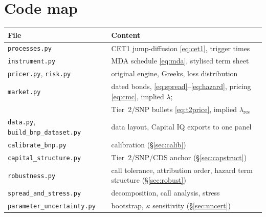\documentclass[11pt]{article}
\newcommand{\1}{\mathbf{1}}
\begin{document}
\section{Code map}
\begin{center}
\small
\begin{tabular}{ll}
\toprule
File & Content \\
\midrule
\texttt{processes.py} & CET1 jump-diffusion \eqref{eq:cet1}, trigger times \\
\texttt{instrument.py} & MDA schedule \eqref{eq:mda}, stylised term sheet \\
\texttt{pricer.py}, \texttt{risk.py} & original engine, Greeks, loss distribution \\
\texttt{market.py} & dated bonds, \eqref{eq:spread}--\eqref{eq:hazard}, pricing \eqref{eq:cmc}, implied $\lambda$; \\
 & Tier~2/SNP bullets \eqref{eq:t2price}, implied $\lambda_{\mathrm{res}}$ \\
\texttt{data.py}, \texttt{build\_bnp\_dataset.py} & data layout, Capital IQ exports to one panel \\
\texttt{calibrate\_bnp.py} & calibration (\S\ref{sec:calib}) \\
\texttt{capital\_structure.py} & Tier~2/SNP/CDS anchor (\S\ref{sec:capstruct}) \\
\texttt{robustness.py} & call tolerance, attribution order, hazard term structure (\S\ref{sec:robust}) \\
\texttt{spread\_and\_stress.py} & decomposition, call analysis, stress \\
\texttt{parameter\_uncertainty.py} & bootstrap, $\kappa$ sensitivity (\S\ref{sec:uncert}) \\
\bottomrule
\end{tabular}
\end{center}
\end{document}
